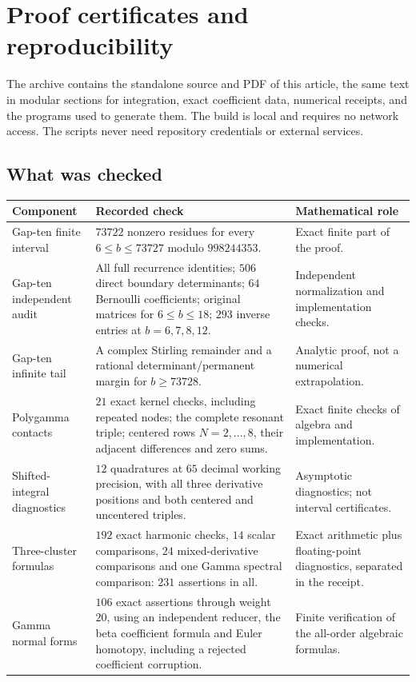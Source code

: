 \section{Proof certificates and reproducibility}
\label{repro:section}

The archive contains the standalone source and PDF of this article,
the same text in modular sections for integration, exact coefficient
data, numerical receipts, and the programs used to generate them.
The build is local and requires no network access. The scripts never
need repository credentials or external services.

\subsection{What was checked}

\begin{longtable}{@{}>{\raggedright\arraybackslash}p{}>{\raggedright\arraybackslash}p{}>{\raggedright\arraybackslash}p{}@{}}
\toprule
Component & Recorded check & Mathematical role\\
\midrule
\endhead
Gap-ten finite interval & $73722$ nonzero residues for every
$6\le b\le73727$ modulo $998244353$. & Exact finite part of the
proof.\\[5pt]
Gap-ten independent audit & All full recurrence identities;
$506$ direct boundary determinants; $64$ Bernoulli coefficients;
original matrices for $6\le b\le18$; $293$ inverse entries at
$b=6,7,8,12$. & Independent normalization and implementation
checks.\\[5pt]
Gap-ten infinite tail & A complex Stirling remainder and a rational
determinant/permanent margin for $b\ge73728$. & Analytic proof,
not a numerical extrapolation.\\[5pt]
Polygamma contacts & $21$ exact kernel checks, including repeated
nodes; the complete resonant triple; centered rows $N=2,\ldots,8$,
their adjacent differences and zero sums. & Exact finite checks
of algebra and implementation.\\[5pt]
Shifted-integral diagnostics & $12$ quadratures at $65$ decimal
working precision, with all three derivative positions and both
centered and uncentered triples. & Asymptotic diagnostics; not
interval certificates.\\[5pt]
Three-cluster formulas & $192$ exact harmonic checks, $14$ scalar
comparisons, $24$ mixed-derivative comparisons and one Gamma
spectral comparison: $231$ assertions in all. & Exact arithmetic
plus floating-point diagnostics, separated in the receipt.\\[5pt]
Gamma normal forms & $106$ exact assertions through weight $20$,
using an independent reducer, the beta coefficient formula and
Euler homotopy, including a rejected coefficient corruption.
& Finite verification of the all-order algebraic formulas.\\
\bottomrule
\end{longtable}

